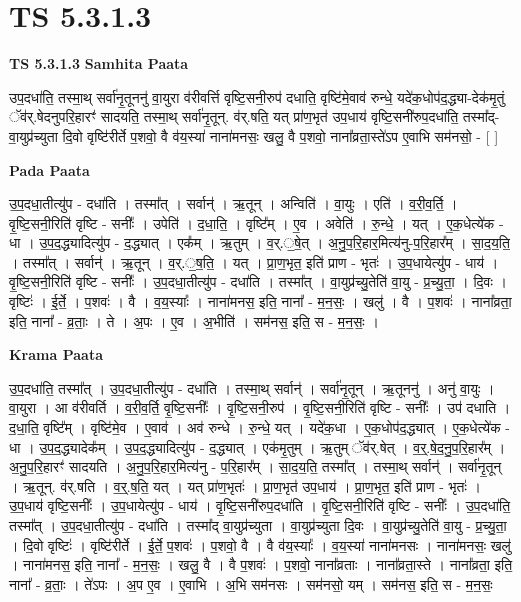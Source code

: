 \documentclass[17pt]{extarticle}
\begin{document}
\section{ TS 5.3.1.3 }

\textbf{TS 5.3.1.3 } \newline
\textbf{Samhita Paata} \newline

उप॒दधा॑ति॒ तस्मा॒थ् सर्वा॑नृ॒तूननु॑ वा॒युरा व॑रीवर्त्ति वृष्टि॒सनी॒रुप॑ दधाति॒ वृष्टि॑मे॒वाव॑ रुन्धे॒ यदे॑क॒धोप॑द॒द्ध्या-देक॑मृ॒तुं ॅव॑र्.षेदनुपरि॒हारꣳ॑ सादयति॒ तस्मा॒थ् सर्वा॑नृ॒तून्. व॑र्.षति॒ यत् प्रा॑ण॒भृत॑ उप॒धाय॑ वृष्टि॒सनी॑रुप॒दधा॑ति॒ तस्मा᳚द्-वा॒युप्र॑च्युता दि॒वो वृष्टि॑रीर्ते प॒शवो॒ वै व॑य॒स्या॑ नाना॑मनसः॒ खलु॒ वै प॒शवो॒ नाना᳚व्रता॒स्ते॑ऽप ए॒वाभि सम॑नसो॒ - [  ] \newline

\textbf{Pada Paata} \newline

उ॒प॒दधा॒तीत्यु॑प - दधा॑ति । तस्मा᳚त् । सर्वान्॑ । ऋ॒तून् । अन्विति॑ । वा॒युः । एति॑ । व॒री॒व॒र्ति॒ । वृ॒ष्टि॒सनी॒रिति॑ वृष्टि - सनीः᳚ । उपेति॑ । द॒धा॒ति॒ । वृष्टि᳚म् । ए॒व । अवेति॑ । रु॒न्धे॒ । यत् । ए॒क॒धेत्ये॑क - धा । उ॒प॒द॒द्ध्यादित्यु॑प - द॒द्ध्यात् । एक᳚म् । ऋ॒तुम् । व॒र्.॒षे॒त् । अ॒नु॒प॒रि॒हार॒मित्य॑नु-प॒रि॒हार᳚म् । सा॒द॒य॒ति॒ । तस्मा᳚त् । सर्वान्॑ । ऋ॒तून् । व॒र्.॒ष॒ति॒ । यत् । प्रा॒ण॒भृत॒ इति॑ प्राण - भृतः॑ । उ॒प॒धायेत्यु॑प - धाय॑ । वृ॒ष्टि॒सनी॒रिति॑ वृष्टि - सनीः᳚ । उ॒प॒दधा॒तीत्यु॑प - दधा॑ति । तस्मा᳚त् । वा॒युप्र॑च्यु॒तेति॑ वा॒यु - प्र॒च्यु॒ता॒ । दि॒वः । वृष्टिः॑ । ई॒र्ते॒ । प॒शवः॑ । वै । व॒य॒स्याः᳚ । नाना॑मनस॒ इति॒ नाना᳚ - म॒न॒सः॒ । खलु॑ । वै । प॒शवः॑ । नाना᳚व्रता॒ इति॒ नाना᳚ - व्र॒ताः॒ । ते । अ॒पः । ए॒व । अ॒भीति॑ । सम॑नस॒ इति॒ स - म॒न॒सः॒ ।  \newline


\textbf{Krama Paata} \newline

उ॒प॒दधा॑ति॒ तस्मा᳚त् । उ॒प॒दधा॒तीत्यु॑प - दधा॑ति । तस्मा॒थ् सर्वान्॑ । सर्वा॑नृ॒तून् । ऋ॒तूननु॑ । अनु॑ वा॒युः । वा॒युरा । आ व॑रीवर्ति । व॒री॒व॒र्ति॒ वृ॒ष्टि॒सनीः᳚ । वृ॒ष्टि॒सनी॒रुप॑ । वृ॒ष्टि॒सनी॒रिति॑ वृष्टि - सनीः᳚ । उप॑ दधाति । द॒धा॒ति॒ वृष्टि᳚म् । वृष्टि॑मे॒व । ए॒वाव॑ । अव॑ रुन्धे । रु॒न्धे॒ यत् । यदे॑क॒धा । ए॒क॒धोप॑द॒द्ध्यात् । ए॒क॒धेत्ये॑क - धा । उ॒प॒द॒द्ध्यादेक᳚म् । उ॒प॒द॒द्ध्यादित्यु॑प - द॒द्ध्यात् । एक॑मृ॒तुम् । ऋ॒तुम् ॅव॑र्.षेत् । व॒र्॒.षे॒द॒नु॒प॒रि॒हार᳚म् । अ॒नु॒प॒रि॒हारꣳ॑ सादयति । अ॒नु॒प॒रि॒हार॒मित्य॑नु - प॒रि॒हार᳚म् । सा॒द॒य॒ति॒ तस्मा᳚त् । तस्मा॒थ् सर्वान्॑ । सर्वा॑नृ॒तून् । ऋ॒तून्. व॑र्.षति । व॒र्॒.ष॒ति॒ यत् । यत् प्रा॑ण॒भृतः॑ । प्रा॒ण॒भृत॑ उप॒धाय॑ । प्रा॒ण॒भृत॒ इति॑ प्राण - भृतः॑ । उ॒प॒धाय॑ वृष्टि॒सनीः᳚ । उ॒प॒धायेत्यु॑प - धाय॑ । वृ॒ष्टि॒सनी॑रुप॒दधा॑ति । वृ॒ष्टि॒सनी॒रिति॑ वृष्टि - सनीः᳚ । उ॒प॒दधा॑ति॒ तस्मा᳚त् । उ॒प॒दधा॒तीत्यु॑प - दधा॑ति । तस्मा᳚द् वा॒युप्र॑च्युता । वा॒युप्र॑च्युता दि॒वः । वा॒युप्र॑च्यु॒तेति॑ वा॒यु - प्र॒च्यु॒ता॒ । दि॒वो वृष्टिः॑ । वृष्टि॑रीर्ते । ई॒र्ते॒ प॒शवः॑ । प॒शवो॒ वै । वै व॑य॒स्याः᳚ । व॒य॒स्या॑ नाना॑मनसः । नाना॑मनसः॒ खलु॑ । नाना॑मनस॒ इति॒ नाना᳚ - म॒न॒सः॒ । खलु॒ वै । वै प॒शवः॑ । प॒शवो॒ नाना᳚व्रताः । नाना᳚व्रता॒स्ते । नाना᳚व्रता॒ इति॒ नाना᳚ - व्र॒ताः॒ । ते॑ऽपः । अ॒प ए॒व । ए॒वाभि । अ॒भि सम॑नसः । सम॑नसो॒ यम् । सम॑नस॒ इति॒ स - म॒न॒सः॒ \newline
\end{document}
